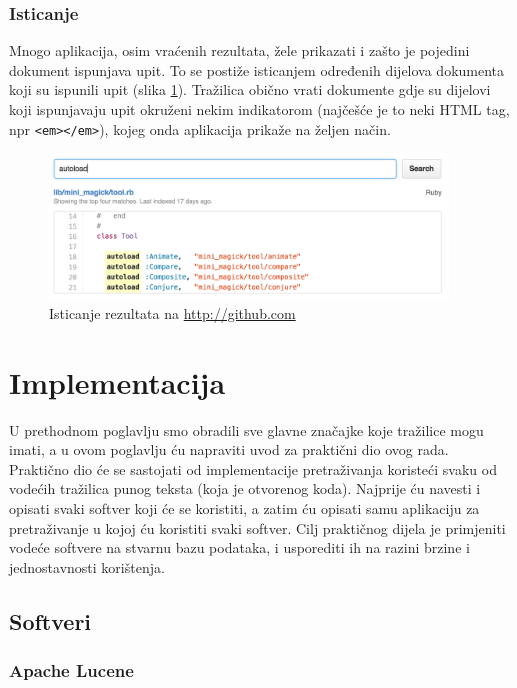 \documentclass[a4paper,twoside,12pt]{scrreprt}
\begin{document}
\subsection{Isticanje}

Mnogo aplikacija, osim vraćenih rezultata, žele prikazati i zašto je pojedini dokument ispunjava upit. To se postiže isticanjem određenih dijelova dokumenta koji su ispunili upit (slika \ref{highlighting}). Tražilica obično vrati dokumente gdje su dijelovi koji ispunjavaju upit okruženi nekim indikatorom (najčešće je to neki HTML tag, npr \texttt{<em></em>}), kojeg onda aplikacija prikaže na željen način.

\begin{figure}[H]
  \centering
  \includegraphics[width=300pt]{highlighting}
  \caption{Isticanje rezultata na \url{http://github.com}}
  \label{highlighting}
\end{figure}

\chapter{Implementacija}

U prethodnom poglavlju smo obradili sve glavne značajke koje tražilice mogu imati, a u ovom poglavlju ću napraviti uvod za praktični dio ovog rada. Praktično dio će se sastojati od implementacije pretraživanja koristeći svaku od vodećih tražilica punog teksta (koja je otvorenog koda). Najprije ću navesti i opisati svaki softver koji će se koristiti, a zatim ću opisati samu aplikaciju za pretraživanje u kojoj ću koristiti svaki softver. Cilj praktičnog dijela je primjeniti vodeće softvere na stvarnu bazu podataka, i usporediti ih na razini brzine i jednostavnosti korištenja.

\section{Softveri}

\subsection{Apache Lucene}
\end{document}
